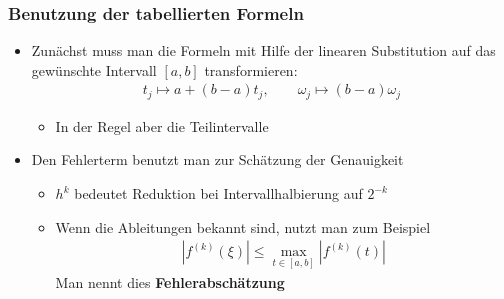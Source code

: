 \begin{frame}
  \frametitle<presentation>{Benutzung der tabellierten Formeln}
  \begin{itemize}
      \item Zunächst muss man die Formeln mit Hilfe der linearen Substitution auf das gewünschte Intervall $[a,b]$ transformieren:
      \begin{gather*}
          t_j \mapsto a + (b-a) t_j,
          \qquad
          \omega_j \mapsto (b-a) \omega_j
      \end{gather*}
      \begin{itemize}
          \item In der Regel aber die Teilintervalle
      \end{itemize}
    \item Den Fehlerterm benutzt man zur Schätzung der Genauigkeit
      \begin{itemize}
          \item $h^k$ bedeutet Reduktion bei Intervallhalbierung auf $2^{-k}$
          \item Wenn die Ableitungen bekannt sind, nutzt man zum Beispiel
          \begin{gather*}
              \left| f^{(k)}(\xi)\right|
              \le \max_{t\in [a,b]} \left| f^{(k)}(t)\right|
            \end{gather*}
            Man nennt dies \textbf{Fehlerabschätzung}
      \end{itemize}
  \end{itemize}
\end{frame}


